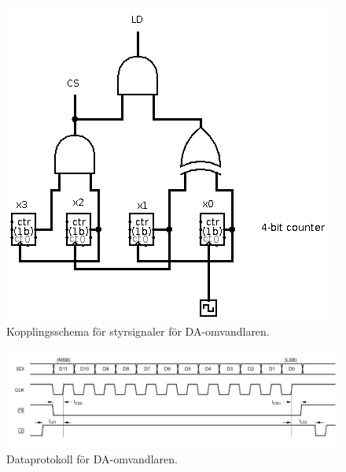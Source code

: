 \documentclass[a4paper,10pt]{article}
\begin{document}
\begin{figure}
\centering
\includegraphics[width=\textwidth]{daccircuit.png}
\caption{Kopplingsschema för styrsignaler för DA-omvandlaren.}
\label{daccircuit}
\end{figure}


\begin{figure}
\centering
\includegraphics[width=\textwidth]{dacdiagram.png}
\caption{Dataprotokoll för DA-omvandlaren.}
\label{daccircuit}
\end{figure}
\end{document}
